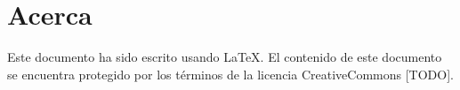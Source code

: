 
\section{Acerca}

Este documento ha sido escrito usando \LaTeX. El contenido de este documento 
se encuentra protegido por los términos de la licencia CreativeCommons [TODO].
